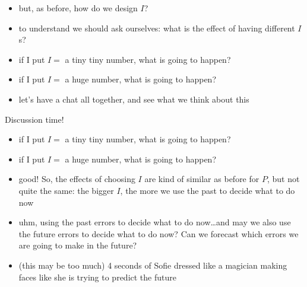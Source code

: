 \begin{frame}
	\begin{itemize}
		\item but, as before, how do we design $I$?
		\item to understand we should ask ourselves: what is the effect of having different $I$s?
		\item if I put $I = $ a tiny tiny number, what is going to happen?
		\item if I put $I = $ a huge number, what is going to happen?
		\item let's have a chat all together, and see what we think about this
	\end{itemize}
\end{frame}


\begin{frame}{Discussion time!}
	\begin{itemize}
		\item if I put $I = $ a tiny tiny number, what is going to happen?
		\item if I put $I = $ a huge number, what is going to happen?
	\end{itemize}
\end{frame}


\begin{frame}
	\begin{itemize}
		\item good! So, the effects of choosing $I$ are kind of similar as before for $P$, but not quite the same: the bigger $I$, the more we use the past to decide what to do now
		\item uhm, using the past errors to decide what to do now\ldots and may we also use the future errors to decide what to do now? Can we forecast which errors we are going to make in the future?
	\end{itemize}
\end{frame}


\begin{frame}
	\begin{itemize}
		\item (this may be too much) 4 seconds of Sofie dressed like a magician making faces like she is trying to predict the future
	\end{itemize}
\end{frame}


